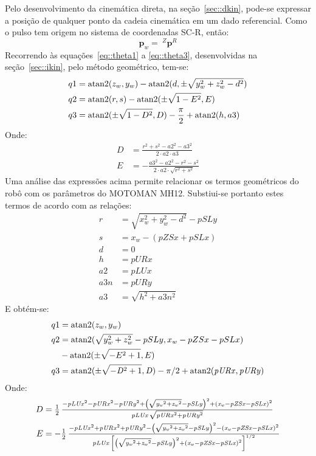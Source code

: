 Pelo desenvolvimento da cinemática direta, na seção~\ref{sec::dkin}, pode-se
expressar a posição de qualquer ponto da cadeia cinemática em um dado
referencial. Como o pulso tem origem no sistema de coordenadas SC-R, então:
%
\begin{equation} \label{eq::pwpr}
	\mathbf{p}_{w} =~^Z{\mathbf{p}}^R 
\end{equation}
%
Recorrendo às equações~\ref{eq::theta1} a \ref{eq::theta3}, desenvolvidas na
seção~\ref{sec::ikin}, pelo método geométrico, tem-se:
%
\begin{align*}
	q1 &= \operatorname{atan2} (z_w,y_w) - \operatorname{atan2} (d, \pm \sqrt{y_w^2 + z_w^2 - d^2}) \\
	q2 &= \operatorname{atan2} (r,s) - \operatorname{atan2} (\pm  \sqrt{1-E^2}, E) \\
	q3 &= \operatorname{atan2} (\pm \sqrt{1-D^2}, D) - \frac{\pi}{2} + \operatorname{atan2} (h, a3)
\end{align*}
%
Onde:
%
\begin{align*}
	D &= \frac{r^2 + s^2 -a2^2 - a3^2}{2 \cdot a2 \cdot a3} \\
	E &= - \frac{a3^2 - a2^2 - r^2 - s^2}{2 \cdot a2 \cdot \sqrt{r^2 + s^2}}
\end{align*}
%
Uma análise das expressões acima permite relacionar os termos geométricos do
robô com os parâmetros do MOTOMAN MH12. Substiui-se portanto estes termos de
acordo com as relações:
%
\begin{align}
	r &= \sqrt{x_w^2 + y_w^2 - d^2} - pSLy \\
	s &= x_w - (pZSx + pSLx) \\
	d &= 0 \\
	h &= pURx \\
	a2 &= pLUx \\
	a3n &= pURy \\
	a3 &= \sqrt{h^2 + a3n^2}
\end{align}
%
E obtém-se:
%
\begin{align}
	q1 &= \operatorname{atan2} (z_w,y_w) \label{eq::q1ik} \\
	q2 &= \operatorname{atan2} ( \sqrt {y_w^2 + z_w^2}- pSLy, x_w - pZSx - pSLx ) \nonumber \\
	   &- \operatorname{atan2} ( \pm \sqrt {-E^2+1}, E ) \\
	q3 &= \operatorname{atan2} ( \pm \sqrt {-{{\it D}}^{2}+1},{\it D} ) -\pi /2 +
\operatorname{atan2} ( {\it pURx},{\it pURy} ) \label{eq::q3ik}
\end{align}
%
Onde:
%
\begin{align}
	D &= \textstyle \frac{1}{2}\,{\frac {-{{\it pLUx}}^{2}-{{\it pURx}}^{2}-{{\it
	pURy}}^{2}+ \left( \sqrt {{{\it y_w}}^{2}+{{\it z_w}}^{2}}-{\it pSLy} \right) ^{2
		}+ \left( {\it x_w}-{\it pZSx}-{\it pSLx} \right) ^{2}}{{\it pLUx}\,
		\sqrt {{{\it pURx}}^{2}+{{\it pURy}}^{2}}}} \\
	E &= \textstyle {-\frac{1}{2}\,{\frac {-{{\it pLUx}}^{2}+{{\it pURx}}^{2}+{{\it
		pURy}}^{2}- \left( \sqrt {{{\it y_w}}^{2}+{{\it z_w}}^{2}}-{\it pSLy} \right)
		^{2 }- \left( {\it x_w}-{\it pZSx}-{\it pSLx} \right) ^{2}}{{\it pLUx}\,
		\left[ \left( \sqrt {{{\it y_w}}^{2}+{{\it z_w}}^{2}}-{\it pSLy}
 		\right) ^{2}+ \left( {\it x_w}-{\it pZSx}-{\it pSLx} \right) ^{2}
 		\right]^{1/2}}}}
\end{align}
